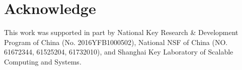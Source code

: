 \section{Acknowledge}
This work was supported in part by National Key Research \& Development Program of China (No. 2016YFB1000502), National NSF of China (NO. 61672344, 61525204, 61732010), and Shanghai Key Laboratory of Scalable Computing and Systems.